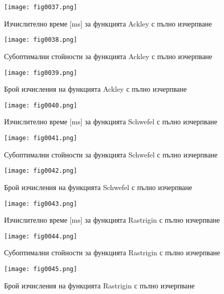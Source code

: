 \begin{figure}[H]
  \centering
  \texttt{[image: fig0037.png]}
  \caption{Изчислително време [ms] за функцията Ackley с пълно изчерпване}
\label{fig0037}
\end{figure}

\begin{figure}[H]
  \centering
  \texttt{[image: fig0038.png]}
  \caption{Субоптимални стойности за функцията Ackley с пълно изчерпване}
\label{fig0038}
\end{figure}

\begin{figure}[H]
  \centering
  \texttt{[image: fig0039.png]}
  \caption{Брой изчисления на функцията Ackley с пълно изчерпване}
\label{fig0039}
\end{figure}

\begin{figure}[H]
  \centering
  \texttt{[image: fig0040.png]}
  \caption{Изчислително време [ms] за функцията Schwefel с пълно изчерпване}
\label{fig0040}
\end{figure}

\begin{figure}[H]
  \centering
  \texttt{[image: fig0041.png]}
  \caption{Субоптимални стойности за функцията Schwefel с пълно изчерпване}
\label{fig0041}
\end{figure}

\begin{figure}[H]
  \centering
  \texttt{[image: fig0042.png]}
  \caption{Брой изчисления на функцията Schwefel с пълно изчерпване}
\label{fig0042}
\end{figure}

\begin{figure}[H]
  \centering
  \texttt{[image: fig0043.png]}
  \caption{Изчислително време [ms] за функцията Rastrigin с пълно изчерпване}
\label{fig0043}
\end{figure}

\begin{figure}[H]
  \centering
  \texttt{[image: fig0044.png]}
  \caption{Субоптимални стойности за функцията Rastrigin с пълно изчерпване}
\label{fig0044}
\end{figure}

\begin{figure}[H]
  \centering
  \texttt{[image: fig0045.png]}
  \caption{Брой изчисления на функцията Rastrigin с пълно изчерпване}
\label{fig0045}
\end{figure}

